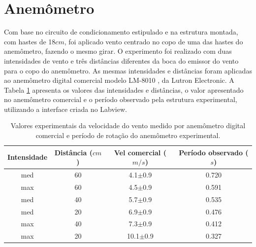 \documentclass[a4paper]{instrumentacao}
\begin{document}
\section{Anemômetro}

Com base no circuito de condicionamento estipulado e na estrutura montada, com hastes de 18$cm$, foi aplicado vento centrado no copo de uma das hastes do anemômetro, fazendo o mesmo girar. O experimento foi realizado com duas intensidades de vento e três distâncias diferentes da boca do emissor do vento para o copo do anemômetro. As mesmas intensidades e distâncias foram aplicadas ao anemômetro digital comercial modelo LM-8010 \cite{anemometro-manual}, da Lutron Electronic. A Tabela \ref{tab:anemometro-amostras-comercial-periodo} apresenta os valores das intensidades e distâncias, o valor apresentado no anemômetro comercial e o período observado pela estrutura experimental, utilizando a interface criada no Labview.

\begin{table}[H]
\centering
\caption{Valores experimentais da velocidade do vento medido por anemômetro digital comercial e período de rotação do anemômetro experimental.}
\label{tab:anemometro-amostras-comercial-periodo}
\begin{tabular}{|c|c|c|c|}
\hline
\textbf{Intensidade} & \textbf{Distância ($cm$)} & \textbf{Vel comercial ($m/s$)} & \textbf{Período observado ($s$)} \\ \hline
med               & 60                      & 4.1$\pm$0.9                           & 0.720                          \\ \hline
max               & 60                      & 4.5$\pm$0.9                           & 0.591                          \\ \hline
med               & 40                      & 5.7$\pm$0.9                           & 0.535                          \\ \hline
med               & 20                      & 6.9$\pm$0.9                           & 0.476                          \\ \hline
max               & 40                      & 7.3$\pm$0.9                           & 0.412                          \\ \hline
max               & 20                      & 10.1$\pm$0.9                          & 0.327                          \\ \hline
\end{tabular}
\end{table}
\end{document}
